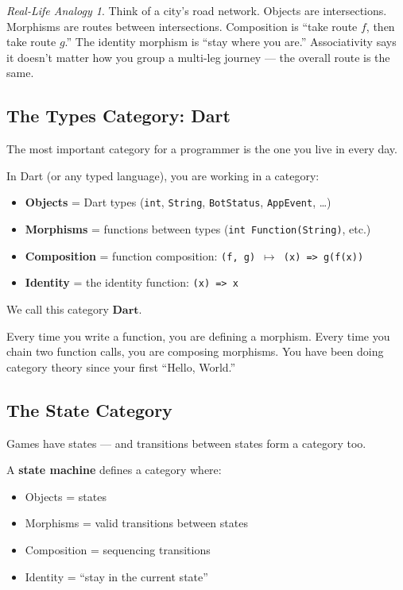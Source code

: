 \documentclass[12pt,a4paper]{article}
\theoremstyle{definition}
\theoremstyle{plain}
\theoremstyle{remark}
\newtheorem*{reallife}{Real-Life Analogy}
\begin{document}
\begin{reallife}
Think of a city's road network.
Objects are intersections.
Morphisms are routes between intersections.
Composition is ``take route $f$, then take route $g$.''
The identity morphism is ``stay where you are.''
Associativity says it doesn't matter how you group a multi-leg journey
--- the overall route is the same.
\end{reallife}

\subsection{The Types Category: \textbf{Dart}}

The most important category for a programmer is the one you live in every day.

\begin{youknow}
In Dart (or any typed language), you are working in a category:
\begin{itemize}
  \item \textbf{Objects} = Dart types (\texttt{int}, \texttt{String},
        \texttt{BotStatus}, \texttt{AppEvent}, \ldots)
  \item \textbf{Morphisms} = functions between types
        (\texttt{int Function(String)}, etc.)
  \item \textbf{Composition} = function composition:
        \texttt{(f, g) $\mapsto$ (x) => g(f(x))}
  \item \textbf{Identity} = the identity function: \texttt{(x) => x}
\end{itemize}
We call this category $\mathbf{Dart}$.
\end{youknow}

Every time you write a function, you are defining a morphism. Every time you
chain two function calls, you are composing morphisms. You have been doing
category theory since your first ``Hello, World.''


\subsection{The State Category}

Games have states --- and transitions between states form a category too.

\begin{formal}
A \textbf{state machine} defines a category where:
\begin{itemize}
  \item Objects = states
  \item Morphisms = valid transitions between states
  \item Composition = sequencing transitions
  \item Identity = ``stay in the current state''
\end{itemize}
\end{formal}
\end{document}
